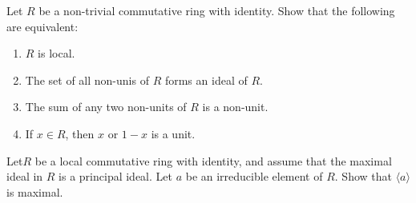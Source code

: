 \documentclass[12pt,letterpaper,boxed]{hmcpset}
\begin{document}
\begin{solution}
\end{solution}

\clearpage

\begin{problem}[18.6.1]
Let $R$ be a non-trivial commutative ring with identity. Show that the following are equivalent:
\begin{enumerate}[label=\alph*]
\item $R$ is local.
\item The set of all non-unis of $R$ forms an ideal of $R$.
\item The sum of any two non-units of $R$ is a non-unit.
\item If $x \in R$, then $x$ or $1-x$ is a unit.
\end{enumerate}
\end{problem}

\begin{solution}
\end{solution}

\clearpage

\begin{problem}[18.6.2]
Let$R$ be a local commutative ring with identity, and assume that the maximal ideal in $R$ is a principal ideal. Let $a$ be an irreducible element of $R$. Show that $\langle a \rangle$ is maximal.
\end{problem}

\begin{solution}
\end{solution}
\end{document}
